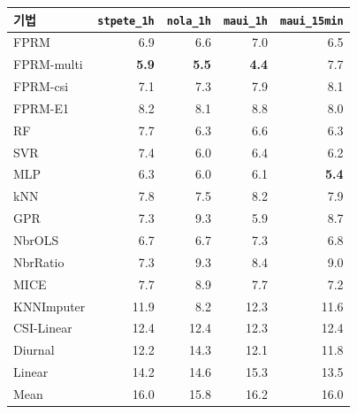 \begin{tabular}{lrrrr}
\toprule
기법 & \texttt{stpete\_1h} & \texttt{nola\_1h} & \texttt{maui\_1h} & \texttt{maui\_15min} \\
\midrule
FPRM & 6.9 & 6.6 & 7.0 & 6.5 \\
FPRM-multi & \textbf{5.9} & \textbf{5.5} & \textbf{4.4} & 7.7 \\
FPRM-csi & 7.1 & 7.3 & 7.9 & 8.1 \\
FPRM-E1 & 8.2 & 8.1 & 8.8 & 8.0 \\
\midrule
RF & 7.7 & 6.3 & 6.6 & 6.3 \\
SVR & 7.4 & 6.0 & 6.4 & 6.2 \\
MLP & 6.3 & 6.0 & 6.1 & \textbf{5.4} \\
kNN & 7.8 & 7.5 & 8.2 & 7.9 \\
GPR & 7.3 & 9.3 & 5.9 & 8.7 \\
\midrule
NbrOLS & 6.7 & 6.7 & 7.3 & 6.8 \\
NbrRatio & 7.3 & 9.3 & 8.4 & 9.0 \\
MICE & 7.7 & 8.9 & 7.7 & 7.2 \\
KNNImputer & 11.9 & 8.2 & 12.3 & 11.6 \\
\midrule
CSI-Linear & 12.4 & 12.4 & 12.3 & 12.4 \\
Diurnal & 12.2 & 14.3 & 12.1 & 11.8 \\
Linear & 14.2 & 14.6 & 15.3 & 13.5 \\
Mean & 16.0 & 15.8 & 16.2 & 16.0 \\
\bottomrule
\end{tabular}
